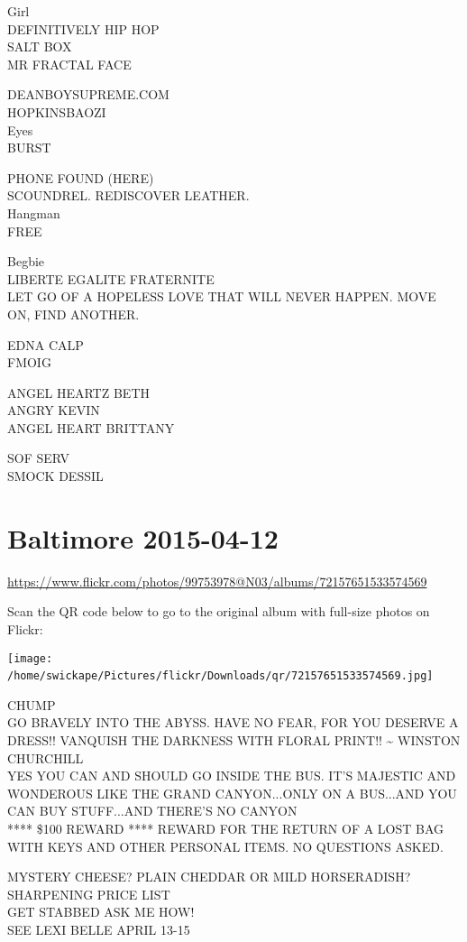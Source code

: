 \documentclass[10pt,letterpaper]{article}
\begin{document}
Girl\\
DEFINITIVELY HIP HOP\\
SALT BOX\\
MR FRACTAL FACE

DEANBOYSUPREME.COM\\
HOPKINSBAOZI\\
Eyes\\
BURST

PHONE FOUND (HERE)\\
SCOUNDREL.  REDISCOVER LEATHER.\\
Hangman\\
FREE

Begbie\\
LIBERTE EGALITE FRATERNITE\\
LET GO OF A HOPELESS LOVE THAT WILL NEVER HAPPEN.  MOVE ON, FIND ANOTHER.

EDNA CALP\\
FMOIG

ANGEL HEARTZ BETH\\
ANGRY KEVIN\\
ANGEL HEART BRITTANY

SOF SERV\\
SMOCK DESSIL
\

\section*{Baltimore 2015-04-12}

\url{https://www.flickr.com/photos/99753978@N03/albums/72157651533574569}

Scan the QR code below to go to the original album with full-size photos on Flickr:

\texttt{[image: /home/swickape/Pictures/flickr/Downloads/qr/72157651533574569.jpg]}
\

CHUMP\\
GO BRAVELY INTO THE ABYSS.  HAVE NO FEAR, FOR YOU DESERVE A DRESS!!  VANQUISH THE DARKNESS WITH FLORAL PRINT!!  \textasciitilde{} WINSTON CHURCHILL\\
YES YOU CAN AND SHOULD GO INSIDE THE BUS.  IT'S MAJESTIC AND WONDEROUS LIKE THE GRAND CANYON...ONLY ON A BUS...AND YOU CAN BUY STUFF...AND THERE'S NO CANYON\\
**** \$100 REWARD **** REWARD FOR THE RETURN OF A LOST BAG WITH KEYS AND OTHER PERSONAL ITEMS.  NO QUESTIONS ASKED.

MYSTERY CHEESE?  PLAIN CHEDDAR OR MILD HORSERADISH?\\
SHARPENING PRICE LIST\\
GET STABBED ASK ME HOW!\\
SEE LEXI BELLE APRIL 13{-}15
\end{document}
